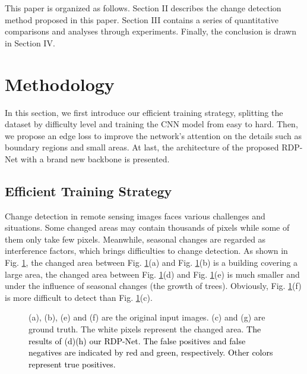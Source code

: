 \documentclass[lettersize,journal]{IEEEtran}
\newcommand{\editc}[1]{\textcolor{black}{#1}}
\begin{document}
This paper is organized as follows.
Section II describes the change detection method proposed in this paper.
Section III contains a series of quantitative comparisons and analyses through experiments.
Finally, the conclusion is drawn in Section IV. 
\section{Methodology}



In this section, we first introduce our efficient training strategy,
splitting the dataset by difficulty level and training the CNN model from easy to hard.
Then, we propose an edge loss to improve the network's attention on the details such as boundary regions and small areas.
At last, the architecture of the proposed RDP-Net with a brand new backbone is presented.


\subsection{Efficient Training Strategy}


Change detection in remote sensing images faces various challenges and situations.
Some changed areas may contain thousands of pixels while some of them only take few pixels.
Meanwhile, seasonal changes are regarded as interference factors, which brings difficulties to change detection.
As shown in Fig. \ref{hierarchical}, the changed area between Fig. \ref{hierarchical}(a) and Fig. \ref{hierarchical}(b) is a building covering a large area, the changed area between Fig. \ref{hierarchical}(d) and Fig. \ref{hierarchical}(e) is much smaller and under the influence of seasonal changes (the growth of trees).
Obviously, Fig. \ref{hierarchical}(f) is more difficult to detect than Fig. \ref{hierarchical}(c).

\begin{figure}[ht]
\centering
{}

\caption{(a), (b), (e) and (f) are the original input images. (c) and (g) are ground truth.
The white pixels represent the changed area.
\editc{The results of (d)(h) our RDP-Net.
The false positives and false negatives are indicated by red and green, respectively.
Other colors represent true positives.}}
\label{hierarchical}
\end{figure}
\end{document}
